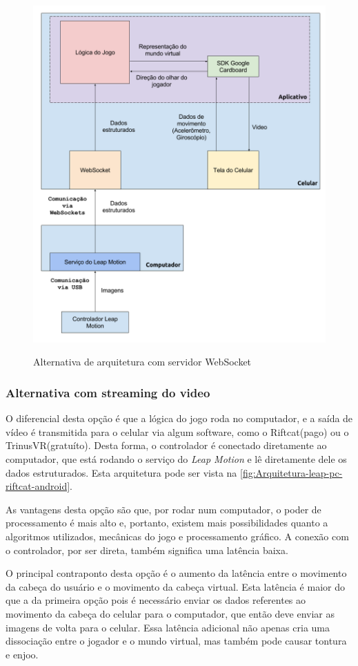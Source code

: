 \begin{figure}[h]
	\centering
	\caption{Alternativa de arquitetura com servidor WebSocket}
	\includegraphics[width=0.7\linewidth]{images/Arquitetura-leap-pc-leapdata-android}
	\legend{\fonteAP}
	\label{fig:arquitetura-leap-pc-leapdata-android}
\end{figure}

\subsubsection{Alternativa com streaming do video}\label{subsubsec-arquiteturas-leapmotion-pc-riftcat-android}

O diferencial desta opção é que a lógica do jogo roda no computador, e a saída de vídeo é transmitida para o celular via algum software, como o Riftcat(pago) ou o TrinusVR(gratuíto). Desta forma, o controlador é conectado diretamente ao computador, que está rodando o serviço do \textit{Leap Motion} e lê diretamente dele os dados estruturados. Esta arquitetura pode ser vista na \autoref{fig:Arquitetura-leap-pc-riftcat-android}.

As vantagens desta opção são que, por rodar num computador, o poder de processamento é mais alto e, portanto, existem mais possibilidades quanto a algoritmos utilizados, mecânicas do jogo e processamento gráfico. A conexão com o controlador, por ser direta, também significa uma latência baixa. 

O principal contraponto desta opção é o aumento da latência entre o movimento da cabeça do usuário e o movimento da cabeça virtual. Esta latência é maior do que a da primeira opção pois é necessário enviar os dados referentes ao movimento da cabeça do celular para o computador, que então deve enviar as imagens de volta para o celular. Essa latência adicional não apenas cria uma dissociação entre o jogador e o mundo virtual, mas também pode causar tontura e enjoo.

